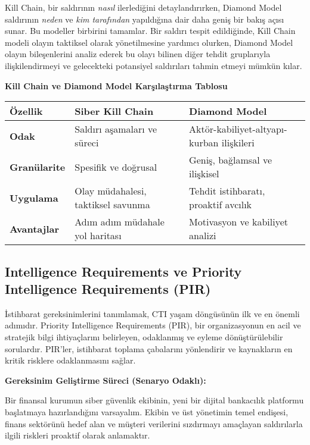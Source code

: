 Kill Chain, bir saldırının \textit{nasıl} ilerlediğini detaylandırırken, Diamond Model saldırının \textit{neden} ve \textit{kim tarafından} yapıldığına dair daha geniş bir bakış açısı sunar. Bu modeller birbirini tamamlar. Bir saldırı tespit edildiğinde, Kill Chain modeli olayın taktiksel olarak yönetilmesine yardımcı olurken, Diamond Model olayın bileşenlerini analiz ederek bu olayı bilinen diğer tehdit gruplarıyla ilişkilendirmeyi ve gelecekteki potansiyel saldırıları tahmin etmeyi mümkün kılar.

\textbf{Kill Chain ve Diamond Model Karşılaştırma Tablosu}

\begin{longtable}{|p{3cm}|p{6cm}|p{6cm}|}
\hline
\textbf{Özellik} & \textbf{Siber Kill Chain} & \textbf{Diamond Model} \\
\hline
\textbf{Odak} & Saldırı aşamaları ve süreci & Aktör-kabiliyet-altyapı-kurban ilişkileri \\
\hline
\textbf{Granülarite} & Spesifik ve doğrusal & Geniş, bağlamsal ve ilişkisel \\
\hline
\textbf{Uygulama} & Olay müdahalesi, taktiksel savunma & Tehdit istihbaratı, proaktif avcılık \\
\hline
\textbf{Avantajlar} & Adım adım müdahale yol haritası & Motivasyon ve kabiliyet analizi \\
\hline
\end{longtable}

\subsection{Intelligence Requirements ve Priority Intelligence Requirements (PIR)}

İstihbarat gereksinimlerini tanımlamak, CTI yaşam döngüsünün ilk ve en önemli adımıdır. Priority Intelligence Requirements (PIR), bir organizasyonun en acil ve stratejik bilgi ihtiyaçlarını belirleyen, odaklanmış ve eyleme dönüştürülebilir sorulardır. PIR'ler, istihbarat toplama çabalarını yönlendirir ve kaynakların en kritik risklere odaklanmasını sağlar.

\textbf{Gereksinim Geliştirme Süreci (Senaryo Odaklı):}

Bir finansal kurumun siber güvenlik ekibinin, yeni bir dijital bankacılık platformu başlatmaya hazırlandığını varsayalım. Ekibin ve üst yönetimin temel endişesi, finans sektörünü hedef alan ve müşteri verilerini sızdırmayı amaçlayan saldırılarla ilgili riskleri proaktif olarak anlamaktır.

